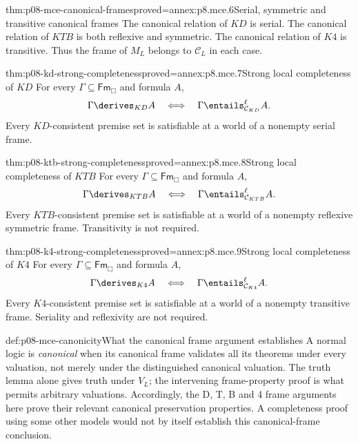 \begin{hblemma}{thm:p08-mce-canonical-frames}{proved=annex:p8.mce.6}{Serial, symmetric and transitive canonical frames}
The canonical relation of \(KD\) is serial. The canonical relation of
\(KTB\) is both reflexive and symmetric. The canonical relation of
\(K4\) is transitive. Thus the frame of \(M_L\) belongs to
\(\mathcal C_L\) in each case.
\end{hblemma}

\begin{hbtheorem}{thm:p08-kd-strong-completeness}{proved=annex:p8.mce.7}{Strong local completeness of \(KD\)}
For every \(\Gamma\subseteq\mathsf{Fm}_{\Box}\) and formula \(A\),
\[
 \Gamma\derives_{KD}A
 \quad\Longleftrightarrow\quad
 \Gamma\entails^{\ell}_{\mathcal C_{KD}}A.
\]
Every \(KD\)-consistent premise set is satisfiable at a world of a
nonempty serial frame.
\end{hbtheorem}

\begin{hbtheorem}{thm:p08-ktb-strong-completeness}{proved=annex:p8.mce.8}{Strong local completeness of \(KTB\)}
For every \(\Gamma\subseteq\mathsf{Fm}_{\Box}\) and formula \(A\),
\[
 \Gamma\derives_{KTB}A
 \quad\Longleftrightarrow\quad
 \Gamma\entails^{\ell}_{\mathcal C_{KTB}}A.
\]
Every \(KTB\)-consistent premise set is satisfiable at a world of a
nonempty reflexive symmetric frame. Transitivity is not required.
\end{hbtheorem}

\begin{hbtheorem}{thm:p08-k4-strong-completeness}{proved=annex:p8.mce.9}{Strong local completeness of \(K4\)}
For every \(\Gamma\subseteq\mathsf{Fm}_{\Box}\) and formula \(A\),
\[
 \Gamma\derives_{K4}A
 \quad\Longleftrightarrow\quad
 \Gamma\entails^{\ell}_{\mathcal C_{K4}}A.
\]
Every \(K4\)-consistent premise set is satisfiable at a world of a
nonempty transitive frame. Seriality and reflexivity are not required.
\end{hbtheorem}

\begin{hbdefinition}{def:p08-mce-canonicity}{What the canonical frame argument establishes}
A normal logic is \emph{canonical} when its canonical frame validates
all its theorems under every valuation, not merely under the distinguished
canonical valuation.
The truth lemma alone gives truth under \(V_L\); the intervening
frame-property proof is what permits arbitrary valuations. Accordingly,
the D, T, B and 4 frame arguments here prove their relevant canonical
preservation properties. A completeness proof using some other models
would not by itself establish this canonical-frame conclusion.
\end{hbdefinition}

